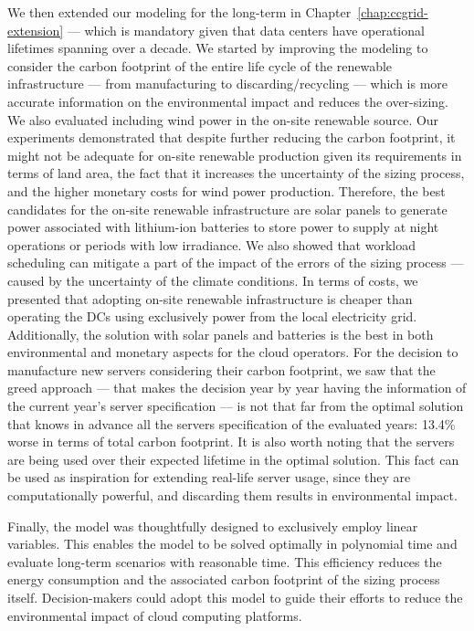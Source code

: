 We then extended our modeling for the long-term in Chapter~\ref{chap:ccgrid-extension} --- which is mandatory given that data centers have operational lifetimes spanning over a decade. We started by improving the modeling to consider the carbon footprint of the entire life cycle of the renewable infrastructure --- from manufacturing to discarding/recycling --- which is more accurate information on the environmental impact and reduces the over-sizing. We also evaluated including wind power in the on-site renewable source. Our experiments demonstrated that despite further reducing the carbon footprint, it might not be adequate for on-site renewable production given its requirements in terms of land area, the fact that it increases the uncertainty of the sizing process, and the higher monetary costs for wind power production. Therefore, the best candidates for the on-site renewable infrastructure are solar panels to generate power associated with lithium-ion batteries to store power to supply at night operations or periods with low irradiance. We also showed that workload scheduling can mitigate a part of the impact of the errors of the sizing process --- caused by the uncertainty of the climate conditions. In terms of costs, we presented that adopting on-site renewable infrastructure is cheaper than operating the DCs using exclusively power from the local electricity grid. Additionally, the solution with solar panels and batteries is the best in both environmental and monetary aspects for the cloud operators. For the decision to manufacture new servers considering their carbon footprint, we saw that the greed approach --- that makes the decision year by year having the information of the current year's server specification --- is not that far from the optimal solution that knows in advance all the servers specification of the evaluated years: 13.4\% worse in terms of total carbon footprint. It is also worth noting that the servers are being used over their expected lifetime in the optimal solution. This fact can be used as inspiration for extending real-life server usage, since they are computationally powerful, and discarding them results in environmental impact.

Finally, the model was thoughtfully designed to exclusively employ linear variables. This enables the model to be solved optimally in polynomial time and evaluate long-term scenarios with reasonable time. This efficiency reduces the energy consumption and the associated carbon footprint of the sizing process itself. Decision-makers could adopt this model to guide their efforts to reduce the environmental impact of cloud computing platforms.

